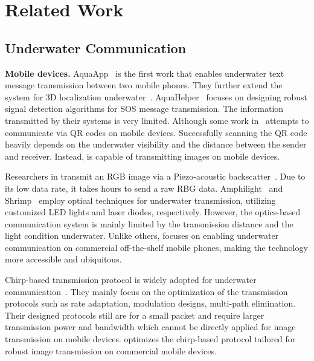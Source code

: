 \section{Related Work}
\label{sec:related_work}

\subsection{Underwater Communication}
\noindent\textbf{Mobile devices.} AquaApp~\cite{chen2022underwater} is the first work that enables underwater text message transmission between two mobile phones. They further extend the system for 3D localization underwater~\cite{chen2023underwater}.
AquaHelper~\cite{yang2023aquahelper,yang80neural} focuses on designing robust signal detection algorithms for SOS message transmission.
The information transmitted by their systems is very limited.
Although some work in~\cite{liu2021uqcom,liu2023uqrcom} attempts to communicate via QR codes on mobile devices. Successfully scanning the QR code heavily depends on the underwater visibility and the distance between the sender and receiver. Instead, \sysname is capable of transmitting images on mobile devices.


Researchers in \cite{afzal2022battery,mobicom24_seascan} transmit an RGB image via a Piezo-acoustic backscatter~\cite{jang2019underwater,rademacher2022enabling}. Due to its low data rate, it takes hours to send a raw RBG data.
Amphilight~\cite{carver2021amphilight} and Shrimp~\cite{lin2021shrimp} employ optical techniques for underwater transmission, utilizing customized LED lights and laser diodes, respectively. However, the optics-based communication system is mainly limited by the transmission distance and the light condition underwater.
Unlike others, \sysname focuses on enabling underwater communication on commercial off-the-shelf mobile phones, making the technology more accessible and ubiquitous.




Chirp-based transmission protocol is widely adopted for underwater communication~\cite{xie2024icc,jia2022two,steinmetz2018practical,steinmetz2022taking,restuccia2017isonar,tonolini2018networking}. They mainly focus on the optimization of the transmission protocols such as rate adaptation, modulation designs, multi-path elimination. Their designed protocols still are for a small packet and require larger transmission power and bandwidth which cannot be directly applied for image transmission on mobile devices.
\sysname optimizes the chirp-based protocol tailored for robust image transmission on commercial mobile devices.

